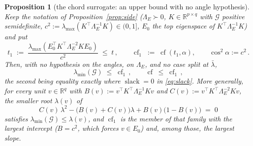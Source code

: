 \documentclass[11pt]{article}
\newtheorem{proposition}[theorem]{Proposition}
\theoremstyle{remark}
\newcommand{\Gr}{\mathcal{G}}
\newcommand{\Le}{\Lambda_E}
\begin{document}
\begin{proposition}[the chord surrogate: an upper bound with no angle hypothesis]
\label{prop:chord}
Keep the notation of Proposition~\ref{prop:side} ($\Le\succ0$, $K\in\mathbb R^{p\times q}$ with
$\Gr$ positive semidefinite, $c^{2}:=\lambda_{\max}(K^{\top}\Le^{-1}K)\in(0,1]$, $E_0$ the top
eigenspace of $K^{\top}\Le^{-1}K$) and put
\begin{equation}\label{eq:chord}
  t_1\;:=\;\frac{\lambda_{\max}(E_0^{\top}K^{\top}\Le^{-2}KE_0)}{c^{2}}\;\le\;t\,,\qquad
  \operatorname{cf}_1\;:=\;\operatorname{cf}(t_1,\alpha),\qquad\cos^{2}\alpha:=c^{2}\,.
\end{equation}
Then, with no hypothesis on the angles, on $\Le$, and no case split at $\bar\lambda$,
\begin{equation}\label{eq:chain1}
  \lambda_{\min}(\Gr)\;\le\;\operatorname{cf}_1\,,\qquad
  \operatorname{cf}\;\le\;\operatorname{cf}_1\,,
\end{equation}
the second being equality exactly where $\operatorname{slack}=0$ in \eqref{eq:slack}. More generally,
for every unit $v\in\mathbb R^{q}$ with $B(v):=v^{\top}K^{\top}\Le^{-1}Kv$ and
$C(v):=v^{\top}K^{\top}\Le^{-2}Kv$, the smaller root $\lambda(v)$ of
\begin{equation}\label{eq:family}
  C(v)\,\lambda^{2}-\bigl(B(v)+C(v)\bigr)\lambda+B(v)\bigl(1-B(v)\bigr)\;=\;0
\end{equation}
satisfies $\lambda_{\min}(\Gr)\le\lambda(v)$, and $\operatorname{cf}_1$ is the member of that family
with the largest intercept ($B=c^{2}$, which forces $v\in E_0$) and, among those, the largest slope.
\end{proposition}
\end{document}
